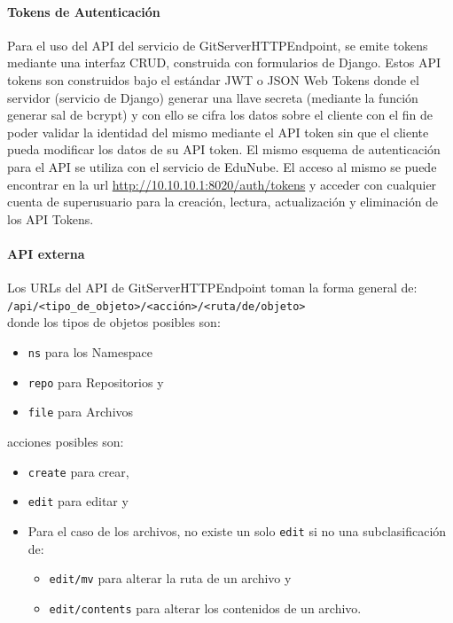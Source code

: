 \paragraph{Tokens de Autenticación}
Para el uso del API del servicio de GitServerHTTPEndpoint, se emite tokens mediante una interfaz CRUD, construida con formularios de Django. Estos API tokens son construidos bajo el estándar JWT o JSON Web Tokens donde el servidor (servicio de Django) generar una llave secreta (mediante la función generar sal de bcrypt) y con ello se cifra los  datos sobre el cliente con el fin de poder validar la identidad del mismo mediante el API token sin que el cliente pueda modificar los datos de su API token. El mismo esquema de autenticación para el API se utiliza con el servicio de EduNube. El acceso al mismo se puede encontrar en la url \url{http://10.10.10.1:8020/auth/tokens} y acceder con cualquier cuenta de superusuario para la creación, lectura, actualización y eliminación de los API Tokens.

\paragraph{API externa}
Los URLs del API de GitServerHTTPEndpoint toman la forma general de: 
\texttt{/api/<tipo\_de\_objeto>/<acción>/<ruta/de/objeto>}\\
donde los tipos de objetos posibles son:
\begin{itemize}
	\item \texttt{ns} para los Namespace
    \item \texttt{repo} para Repositorios y
    \item \texttt{file} para Archivos
\end{itemize}
acciones posibles son:
\begin{itemize}
	\item \texttt{create} para crear,
	\item \texttt{edit} para editar y
    \item Para el caso de los archivos, no existe un solo \texttt{edit} si no una subclasificación de:
    \begin{itemize}
    	\item \texttt{edit/mv}
        para alterar la ruta de un archivo y 
        \item \texttt{edit/contents}
        para alterar los contenidos de un archivo.
    \end{itemize}
\end{itemize}


